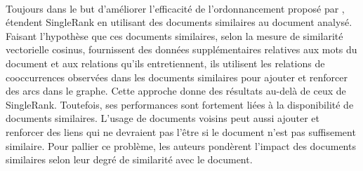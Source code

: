         ~\\Toujours dans le but d'améliorer l'efficacité de l'ordonnancement
        proposé par , 
        étendent SingleRank en utilisant des documents similaires au document
        analysé. Faisant
        l'hypothèse que ces documents similaires, selon la mesure de similarité
        vectorielle cosinus, fournissent des données
        supplémentaires relatives aux mots du document et aux relations
        qu'ils entretiennent, ils utilisent les relations de cooccurrences
        observées dans les documents similaires pour ajouter et renforcer des
        arcs dans le graphe. Cette approche donne des résultats au-delà de ceux
        de SingleRank. Toutefois, ses performances sont fortement liées à la
        disponibilité de documents similaires. L'usage de documents voisins peut
        aussi ajouter et renforcer des liens qui ne devraient pas l'être si le
        document n'est pas suffisement similaire. Pour pallier ce problème, les
        auteurs pondèrent l'impact des documents similaires selon leur degré de
        similarité avec le document.

